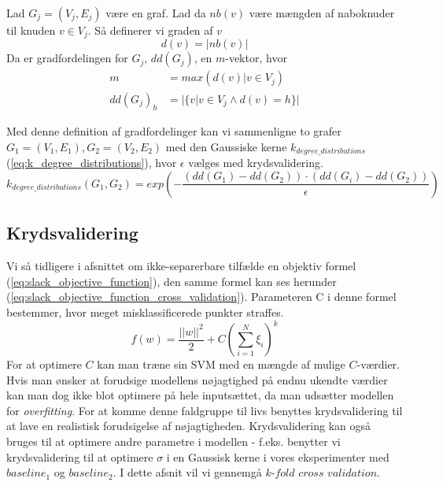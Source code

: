 \documentclass{article}
\begin{document}
Lad $G_j=(V_j,E_j)$ være en graf. Lad da $nb(v)$ være mængden af naboknuder til knuden $v\in V_j$. Så definerer vi graden af $v$
\begin{equation}
d(v) = |nb(v)|
\end{equation}
Da er gradfordelingen for $G_j$, $dd(G_j)$, en $m$-vektor, hvor
\begin{align}
m&=max(d(v) | v\in V_j)\\
dd(G_j)_h&=|\{v | v\in V_j \land d(v) = h\}|
\end{align}

Med denne definition af gradfordelinger kan vi sammenligne to grafer $G_1=(V_1,E_1),G_2=(V_2,E_2)$ med den Gaussiske kerne $k_{degree\_distributions}$ (\ref{eq:k_degree_distributions}), hvor $\epsilon$ vælges med krydsvalidering.
\begin{equation}
\label{eq:k_degree_distributions}
k_{degree\_distributions}(G_1,G_2)=exp\left(-\frac{(dd(G_1)-dd(G_2))\cdot(dd(G_i)-dd(G_2))}{\epsilon}\right)
\end{equation}


\subsection{Krydsvalidering}
Vi så tidligere i afsnittet om ikke-separerbare tilfælde en objektiv formel (\ref{eq:slack_objective_function}), den samme formel kan ses herunder (\ref{eq:slack_objective_function_cross_validation}). Parameteren C i denne formel bestemmer, hvor meget misklassificerede punkter straffes. 
\begin{equation}
f(w) = \frac{||w||^2}{2}+C(\sum\limits_{i=1}^N \xi_i)^k
\label{eq:slack_objective_function_cross_validation}
\end{equation}
For at optimere $C$ kan man træne sin SVM med en mængde af mulige $C$-værdier. Hvis man ønsker at forudsige modellens nøjagtighed på endnu ukendte værdier kan man dog ikke blot optimere på hele inputsættet, da man udsætter modellen for \textit{overfitting}. For at komme denne faldgruppe til livs benyttes krydsvalidering til at lave en realistisk forudsigelse af nøjagtigheden. Krydsvalidering kan også bruges til at optimere andre parametre i modellen - f.eks. benytter vi krydsvalidering til at optimere $\sigma$ i en Gaussisk kerne i vores eksperimenter med $baseline_1$ og $baseline_2$. I dette afsnit vil vi gennemgå $\textit{k-fold cross validation}$.
\end{document}
